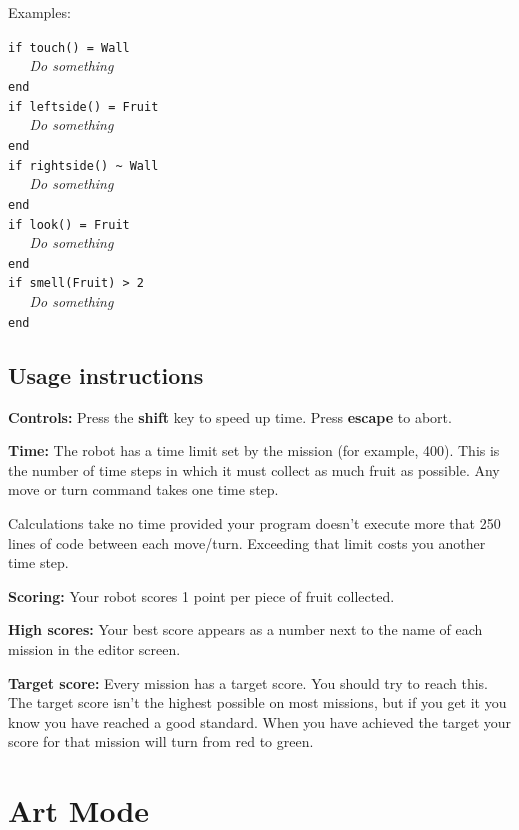 \documentclass[12pt,a4paper,twoside]{article}
\renewcommand{\_}{\texttt{\symbol{95}}}
\begin{document}
Examples:

\verb^if touch() = Wall^\\
\verb^   ^\textit{Do something}\\
\verb^end^\\
\verb^if leftside() = Fruit^\\
\verb^   ^\textit{Do something}\\
\verb^end^\\
\verb^if rightside() ~ Wall^\\
\verb^   ^\textit{Do something}\\
\verb^end^\\
\verb^if look() = Fruit^\\
\verb^   ^\textit{Do something}\\
\verb^end^\\
\verb^if smell(Fruit) > 2^\\
\verb^   ^\textit{Do something}\\
\verb^end^\\

\subsection{Usage instructions}

\textbf{Controls:}
Press the \textbf{shift} key to speed up time. Press \textbf{escape} to abort.

\textbf{Time:}
The robot has a time limit set by the mission (for example, 400).
This is the number of time steps in which it must collect as much fruit
as possible. Any move or turn command takes one time step.

Calculations take no time provided your program doesn't
execute more that 250 lines of code between each move/turn.
Exceeding that limit costs you another time step.

\textbf{Scoring:}
Your robot scores 1 point per piece of fruit collected. 

\textbf{High scores:}
Your best score appears as a number next to the name of each mission
in the editor screen.

\textbf{Target score:}
Every mission has a target score. You should try to reach this.
The target score isn't the highest possible on most missions, but
if you get it you know you have reached a good standard. When you have
achieved the target your score for that mission will turn from red to green.

\newpage
\section{Art Mode} \label{sec:art-mode}
\end{document}
